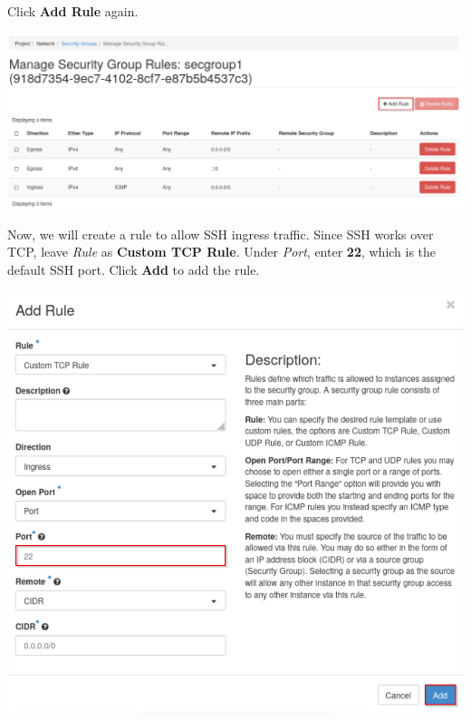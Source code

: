 \documentclass[letterpaper, 12pt]{article}
\begin{document}
\begin{enumerate}
    \begin{labstep}
        Click \textbf{Add Rule} again.

        \begin{center}
            \includegraphics[width=\linewidth]{images/part5/step6.png}
        \end{center}
    \end{labstep}

    \begin{labstep}
        Now, we will create a rule to allow SSH ingress traffic.
        Since SSH works over TCP, leave \textit{Rule} as \textbf{Custom TCP Rule}.
        Under \textit{Port}, enter \textbf{22}, which is the default SSH port.
        Click \textbf{Add} to add the rule.

        \begin{center}
            \includegraphics[width=\linewidth]{images/part5/step7.png}
        \end{center}
    \end{labstep}


\end{enumerate}
\end{document}
